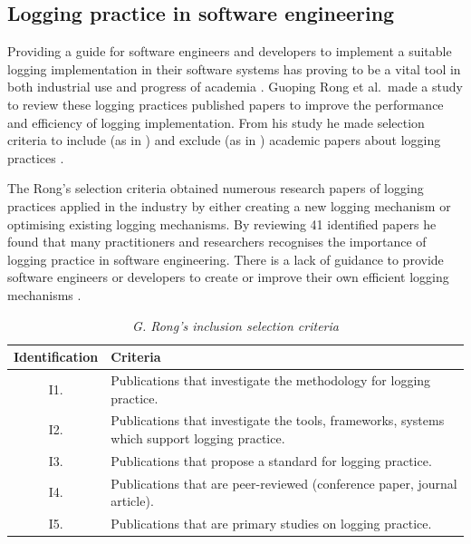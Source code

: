 \subsection{Logging practice in software engineering}
Providing a guide for software engineers and developers to implement a suitable logging implementation in their software systems has proving to be a vital tool in both industrial use and progress of academia \cite{Rong2018a}. Guoping Rong et al.~made a study to review these logging practices published papers to improve the performance and efficiency of logging implementation. From his study he made selection criteria to include (as in ) and exclude (as in ) academic papers about logging practices \cite{Rong2018a,Rong2018}.\par The Rong's selection criteria obtained numerous research papers of logging practices applied in the industry by either creating a new logging mechanism or optimising existing logging mechanisms. By reviewing 41 identified papers he found that many practitioners and researchers recognises the importance of logging practice in software engineering. There is a lack of guidance to provide software engineers or developers to create or improve their own efficient logging mechanisms \cite{Rong2018a,Zhu2015}. 

\begin{table}[!htb]
	\centering
	\small
	\caption[G. Rong's inclusion selection criteria]
	{\textit{G. Rong's inclusion selection criteria \cite{Rong2018a}}}
	\label{tbl:CH1_RongIncSelectionCriteria}
	\begin{tabularx}{\textwidth}{|c|X|}
		\hline \textbf{Identification} & \textbf{Criteria} \\
		\hline I1. & Publications that investigate the methodology for logging practice. \\
		\hline I2. & Publications that investigate the tools, frameworks, systems which support logging practice. \\
		\hline I3. & Publications that propose a standard for logging practice.\\
		\hline I4. & Publications that are peer-reviewed (conference paper, journal article). \\
		\hline I5. & Publications that are primary studies on logging practice. \\
		\hline
	\end{tabularx}
\end{table}

